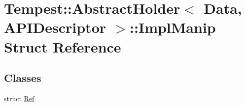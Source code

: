 \hypertarget{struct_tempest_1_1_abstract_holder_1_1_impl_manip}{\section{Tempest\+:\+:Abstract\+Holder$<$ Data, A\+P\+I\+Descriptor $>$\+:\+:Impl\+Manip Struct Reference}
\label{struct_tempest_1_1_abstract_holder_1_1_impl_manip}
}
\subsection*{Classes}
\begin{DoxyCompactItemize}
\item 
struct \hyperlink{struct_tempest_1_1_abstract_holder_1_1_impl_manip_1_1_ref}{Ref}
\end{DoxyCompactItemize}
